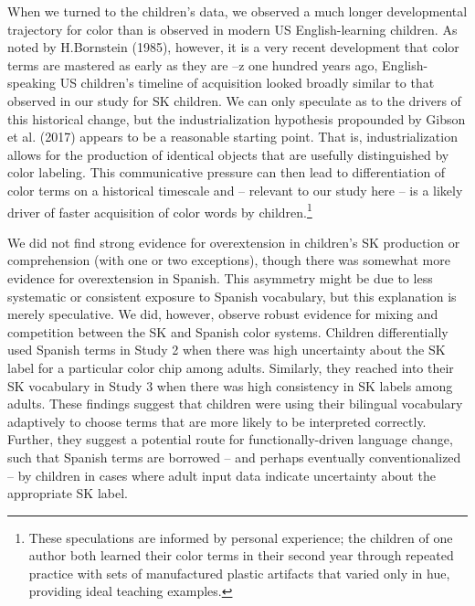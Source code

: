 \documentclass[
  english,
  ,man,floatsintext]{apa6}
\begin{document}
When we turned to the children's data, we observed a much longer developmental trajectory for color than is observed in modern US English-learning children. As noted by H.Bornstein (1985), however, it is a very recent development that color terms are mastered as early as they are --z one hundred years ago, English-speaking US children's timeline of acquisition looked broadly similar to that observed in our study for SK children. We can only speculate as to the drivers of this historical change, but the industrialization hypothesis propounded by Gibson et al. (2017) appears to be a reasonable starting point. That is, industrialization allows for the production of identical objects that are usefully distinguished by color labeling. This communicative pressure can then lead to differentiation of color terms on a historical timescale and -- relevant to our study here -- is a likely driver of faster acquisition of color words by children.\footnote{These speculations are informed by personal experience; the children of one author both learned their color terms in their second year through repeated practice with sets of manufactured plastic artifacts that varied only in hue, providing ideal teaching examples.}

We did not find strong evidence for overextension in children's SK production or comprehension (with one or two exceptions), though there was somewhat more evidence for overextension in Spanish. This asymmetry might be due to less systematic or consistent exposure to Spanish vocabulary, but this explanation is merely speculative. We did, however, observe robust evidence for mixing and competition between the SK and Spanish color systems. Children differentially used Spanish terms in Study 2 when there was high uncertainty about the SK label for a particular color chip among adults. Similarly, they reached into their SK vocabulary in Study 3 when there was high consistency in SK labels among adults. These findings suggest that children were using their bilingual vocabulary adaptively to choose terms that are more likely to be interpreted correctly. Further, they suggest a potential route for functionally-driven language change, such that Spanish terms are borrowed -- and perhaps eventually conventionalized -- by children in cases where adult input data indicate uncertainty about the appropriate SK label.
\end{document}
